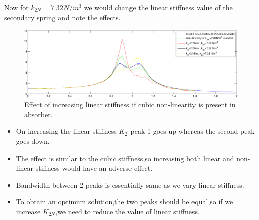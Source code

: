 Now for $k_{2N}=7.32 N/m^3$ we would change the linear stiffness value of the secondary spring and note the effects.
\begin{figure}[h!]
\includegraphics[width=\textwidth,height=0.5\textwidth]{"figures/nonlinearity_secondary_2"}
  \caption{Effect of increasing linear stiffness if cubic non-linearity is present in absorber.}
  \label{fig:non-linear secondary 2}
  \end{figure}
  \begin{itemize}
  \item On increasing the linear stiffness $K_2$ peak 1 goes up whereas the second peak goes down.
  \item The effect is similar to the cubic stiffness,so increasing both linear and non-linear stiffness would have an adverse effect.
  \item Bandwidth between 2 peaks is essentially same as we vary linear stiffness.
  \item To obtain an optimum solution,the two peaks should be equal,so if we increase $K_{2N}$,we need to reduce the value of linear stiffness.
  \end{itemize}
